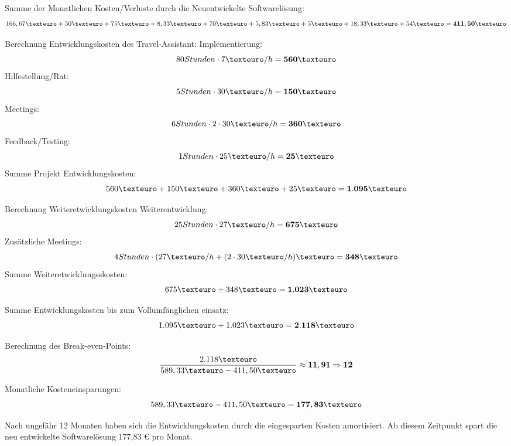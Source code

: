 Summe der Monatlichen Kosten/Verluste durch die Neuentwickelte Softwarelösung: \[166,67€ + 50€ + 75€ + 8,33€ + 70€ + 5,83€ + 5€ + 18,33€ +54€ =  \bf{411,50€} \]

Berechnung Entwicklungskosten des Travel-Assistant:
	Implementierung: \[ 80 Stunden \cdot 7€/h =  \bf{560€} \]
	Hilfestellung/Rat: \[ 5 Stunden \cdot 30€/h =  \bf{150€} \]
	Meetings: \[ 6 Stunden \cdot 2 \cdot 30€/h =  \bf{360€} \]
	Feedback/Testing: \[ 1 Stunden \cdot 25€/h =  \bf{25€} \]
Summe Projekt Entwicklungskosten: \[560€ + 150€ + 360€ + 25€ =  \bf{1.095€} \]

Berechnung Weiteretwicklungskosten
	Weiterentwicklung: \[ 25 Stunden \cdot 27€/h =  \bf{675€} \]
	Zusätzliche Meetings: \[ 4 Stunden \cdot ( 27€/h + ( 2 \cdot 30€/h)€ =  \bf{348€} \]
Summe Weiteretwicklungsskosten: \[675€ + 348€ =  \bf{1.023€} \]

Summe Entwicklungskosten bis zum Vollumfänglichen einsatz: \[1.095€ + 1.023€ =  \bf{2.118€} \]

Berechnung des Break-even-Points: \[ \displaystyle\frac{2.118€}{589,33€ - 411,50€} \approx  \bf{11,91} \Rightarrow 12 \] 

Monatliche Kosteneinsparungen:
\[ 589,33€ - 411,50€ =  \bf{177,83€} \]

Nach ungefähr 12 Monaten haben sich die Entwicklungskosten durch die eingesparten Kosten amortisiert. Ab diesem Zeitpunkt spart die neu entwickelte Softwarelösung 177,83 € pro Monat.